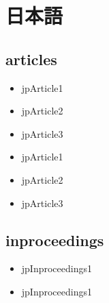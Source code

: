 \documentclass[10pt, a4paper]{jsarticle}
\newcommand{\putlst}[1]{
  \noindent\makebox[\linewidth]{\rule{\linewidth}{0.4pt}}\vspace{-1.5zw}
  \vspace{-1.8zw}
  \noindent\makebox[\linewidth]{\rule{\linewidth}{0.4pt}}\vspace{0.5zw}\par
}
\begin{document}
\section{日本語}

\subsection{articles}

\putlst{bib/jparticle.bib}

\begin{bibunit}[IEEJtran]
  \begin{itemize}
    \item jpArticle1 \cite{jpArticle1}
    \item jpArticle2 \cite{jpArticle2}
    \item jpArticle3 \cite{jpArticle3}
  \end{itemize}
  {\small {}}
\end{bibunit}
\begin{bibunit}[jIEEEtran]
  \begin{itemize}
    \item jpArticle1 \cite{jpArticle1}
    \item jpArticle2 \cite{jpArticle2}
    \item jpArticle3 \cite{jpArticle3}
  \end{itemize}
  {\small {}}
\end{bibunit}


\subsection{inproceedings}

\putlst{bib/jpinproceedings.bib}

\begin{bibunit}[IEEJtran]
  \begin{itemize}
    \item jpInproceedings1 \cite{jpInproceedings1}
  \end{itemize}
  {\small {}}
\end{bibunit}
\begin{bibunit}[jIEEEtran]
  \begin{itemize}
    \item jpInproceedings1 \cite{jpInproceedings1}
  \end{itemize}
  {\small {}}
\end{bibunit}
\end{document}
